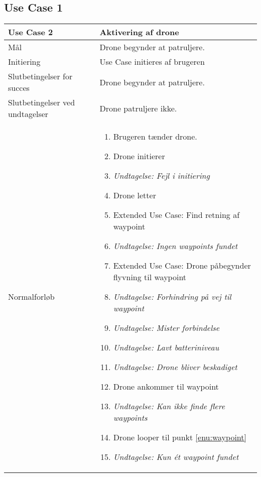 \documentclass[Main]{subfiles}
\begin{document}
\subsection{Use Case 1}

\begin{longtable}{|p{}|p{}|}
\hline
Use Case 2 	& Aktivering af drone \\ \hline

Mål 		& Drone begynder at patruljere. \\ \hline

Initiering	& Use Case initieres af brugeren \\ \hline

Slutbetingelser for succes & 
Drone begynder at patruljere.  \\ \hline

Slutbetingelser ved undtagelser & 
Drone patruljere ikke. \\ \hline

Normalforløb &	\vspace{-8mm}
	\begin{enumerate}[noitemsep,nolistsep,leftmargin=*]
	\item Brugeren tænder drone.
	\item Drone initierer
	\item[] \textit{Undtagelse: Fejl i initiering}
	\item Drone letter
	\item \label{enu:waypoint} Extended Use Case: Find retning af waypoint
	\item[] \textit{Undtagelse: Ingen waypoints fundet}
	\item \label{enu:flyvning} Extended Use Case: Drone påbegynder flyvning til waypoint
	\item[] \textit{Undtagelse: Forhindring på vej til waypoint}
	\item[] \textit{Undtagelse: Mister forbindelse}
	\item[] \textit{Undtagelse: Lavt batteriniveau}
	\item[] \textit{Undtagelse: Drone bliver beskadiget}
	\item Drone ankommer til waypoint
	\item[] \textit{Undtagelse: Kan ikke finde flere waypoints}
	\item Drone looper til punkt \ref{enu:waypoint}
	\item[] \textit{Undtagelse: Kun ét waypoint fundet}
	\end{enumerate} \\ \hline


\end{longtable}
\end{document}
